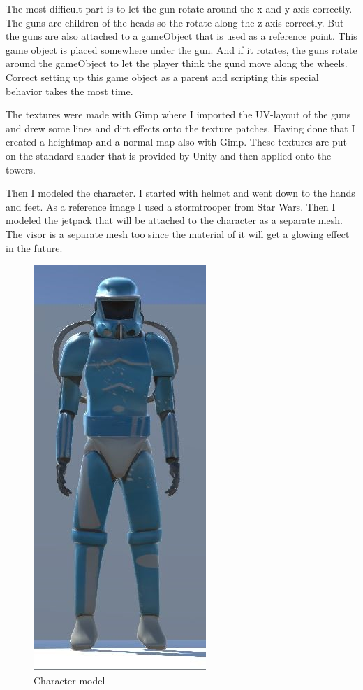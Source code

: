 \documentclass[12pt, letterpaper]{scrartcl}
\begin{document}
	The most difficult part is to let the gun rotate around the x and y-axis correctly. The guns are children of the heads so the rotate along the z-axis correctly. But the guns are also attached to a gameObject that is used as a reference point. This game object is placed somewhere under the gun. And if it rotates, the guns rotate around the gameObject to let the player think the gund move along the wheels. Correct setting up this game object as a parent and scripting this special behavior takes the most time.
	
	The textures were made with Gimp where I imported the UV-layout of the guns and drew some lines and dirt effects onto the texture patches. Having done that I created a heightmap and a normal map also with Gimp. These textures are put on the standard shader that is provided by Unity and then applied onto the towers.
	
	Then I modeled the character. I started with helmet and went down to the hands and feet. As a reference image I used a stormtrooper from Star Wars. Then I modeled the jetpack that will be attached to the character as a separate mesh. The visor is a separate mesh too since the material of it will get a glowing effect in the future.
	
	\begin{figure}[H]
		\centering
		\includegraphics[]{images//interim/character}
		\caption{Character model}
	\end{figure}
	
\end{document}
